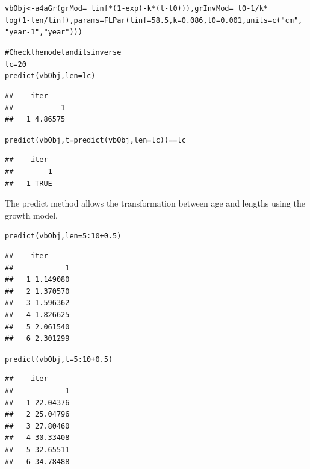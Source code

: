 \documentclass[a4paper,english,10pt]{article}\usepackage[]{graphicx}\usepackage[]{color}
\makeatletter
\newcommand{\hlnum}[1]{\textcolor[rgb]{0.063,0.58,0.627}{#1}}%
\newcommand{\hlstr}[1]{\textcolor[rgb]{0.063,0.58,0.627}{#1}}%
\newcommand{\hlcom}[1]{\textcolor[rgb]{0.588,0.588,0.588}{#1}}%
\newcommand{\hlopt}[1]{\textcolor[rgb]{0.196,0.196,0.196}{#1}}%
\newcommand{\hlstd}[1]{\textcolor[rgb]{0.196,0.196,0.196}{#1}}%
\newcommand{\hlkwb}[1]{\textcolor[rgb]{0.627,0,0.314}{#1}}%
\newcommand{\hlkwc}[1]{\textcolor[rgb]{0,0.631,0.314}{#1}}%
\newcommand{\hlkwd}[1]{\textcolor[rgb]{0.78,0.227,0.412}{#1}}%
\newenvironment{kframe}{%
 \def\at@end@of@kframe{}%
 \ifinner\ifhmode%
  \def\at@end@of@kframe{\end{minipage}}%
  \begin{minipage}{\columnwidth}%
 \fi\fi%
 \def\FrameCommand##1{\hskip\@totalleftmargin \hskip-\fboxsep
 \colorbox{shadecolor}{##1}\hskip-\fboxsep
     \hskip-\linewidth \hskip-\@totalleftmargin \hskip\columnwidth}%
 \MakeFramed {\advance\hsize-\width
   \@totalleftmargin\z@ \linewidth\hsize
   \@setminipage}}%
 {\par\unskip\endMakeFramed%
 \at@end@of@kframe}
\newenvironment{knitrout}{}{} %
\makeatother
\begin{document}
\begin{knitrout}
\color{fgcolor}\begin{kframe}
\begin{alltt}
\hlstd{vbObj} \hlkwb{<-} \hlkwd{a4aGr}\hlstd{(}\hlkwc{grMod} \hlstd{=} \hlopt{~}\hlstd{linf} \hlopt{*} \hlstd{(}\hlnum{1} \hlopt{-} \hlkwd{exp}\hlstd{(}\hlopt{-}\hlstd{k} \hlopt{*} \hlstd{(t} \hlopt{-} \hlstd{t0))),} \hlkwc{grInvMod} \hlstd{=} \hlopt{~}\hlstd{t0} \hlopt{-} \hlnum{1}\hlopt{/}\hlstd{k} \hlopt{*}
    \hlkwd{log}\hlstd{(}\hlnum{1} \hlopt{-} \hlstd{len}\hlopt{/}\hlstd{linf),} \hlkwc{params} \hlstd{=} \hlkwd{FLPar}\hlstd{(}\hlkwc{linf} \hlstd{=} \hlnum{58.5}\hlstd{,} \hlkwc{k} \hlstd{=} \hlnum{0.086}\hlstd{,} \hlkwc{t0} \hlstd{=} \hlnum{0.001}\hlstd{,} \hlkwc{units} \hlstd{=} \hlkwd{c}\hlstd{(}\hlstr{"cm"}\hlstd{,}
    \hlstr{"year-1"}\hlstd{,} \hlstr{"year"}\hlstd{)))}

\hlcom{# Check the model and its inverse}
\hlstd{lc} \hlkwb{=} \hlnum{20}
\hlkwd{predict}\hlstd{(vbObj,} \hlkwc{len} \hlstd{= lc)}
\end{alltt}
\begin{verbatim}
##    iter
##           1
##   1 4.86575
\end{verbatim}
\begin{alltt}
\hlkwd{predict}\hlstd{(vbObj,} \hlkwc{t} \hlstd{=} \hlkwd{predict}\hlstd{(vbObj,} \hlkwc{len} \hlstd{= lc))} \hlopt{==} \hlstd{lc}
\end{alltt}
\begin{verbatim}
##    iter
##        1
##   1 TRUE
\end{verbatim}
\end{kframe}
\end{knitrout}

The predict method allows the transformation between age and lengths using the growth model.

\begin{knitrout}
\color{fgcolor}\begin{kframe}
\begin{alltt}
\hlkwd{predict}\hlstd{(vbObj,} \hlkwc{len} \hlstd{=} \hlnum{5}\hlopt{:}\hlnum{10} \hlopt{+} \hlnum{0.5}\hlstd{)}
\end{alltt}
\begin{verbatim}
##    iter
##            1
##   1 1.149080
##   2 1.370570
##   3 1.596362
##   4 1.826625
##   5 2.061540
##   6 2.301299
\end{verbatim}
\begin{alltt}
\hlkwd{predict}\hlstd{(vbObj,} \hlkwc{t} \hlstd{=} \hlnum{5}\hlopt{:}\hlnum{10} \hlopt{+} \hlnum{0.5}\hlstd{)}
\end{alltt}
\begin{verbatim}
##    iter
##            1
##   1 22.04376
##   2 25.04796
##   3 27.80460
##   4 30.33408
##   5 32.65511
##   6 34.78488
\end{verbatim}
\end{kframe}
\end{knitrout}
\end{document}
